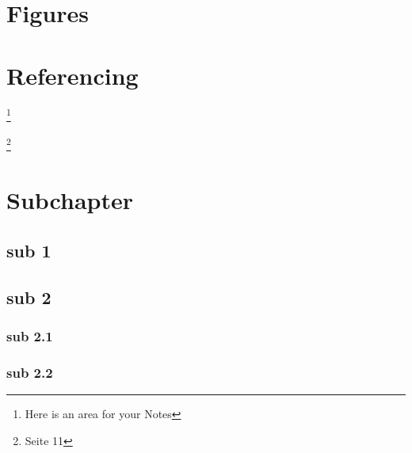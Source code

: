 \documentclass[a4paper, 12pt, oneside, BCOR1cm,toc=chapterentrywithdots]{scrbook}
\begin{document}
\chapter{Figures}

\chapter{Referencing}

\blindtext 

\blindtext \footnote{Here is an area for your Notes}

\blindtext \footnote{Seite 11}
\blindtext 
\blindtext 


\chapter{Subchapter}

\section{sub 1}
\blindtext[3]
\section{sub 2}
\blindtext[3]
\subsection{sub 2.1}
\blindtext[3]

\subsection{sub 2.2}
\blindtext[3]


%
%

\printindex
\end{document}
